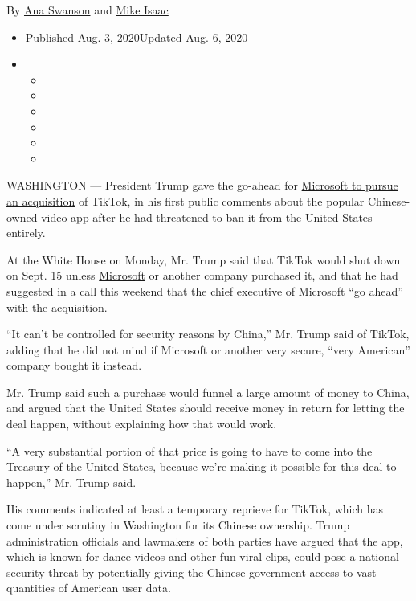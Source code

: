 By \href{https://www.nytimes.com/by/ana-swanson}{Ana Swanson} and
\href{https://www.nytimes.com/by/mike-isaac}{Mike Isaac}

\begin{itemize}
\item
  Published Aug. 3, 2020Updated Aug. 6, 2020
\item
  \begin{itemize}
  \item
  \item
  \item
  \item
  \item
  \item
  \end{itemize}
\end{itemize}

WASHINGTON --- President Trump gave the go-ahead for
\href{https://www.nytimes.com/2020/08/02/business/economy/trump-tiktok-china-national-security.html}{Microsoft
to pursue an acquisition} of TikTok, in his first public comments about
the popular Chinese-owned video app after he had threatened to ban it
from the United States entirely.

At the White House on Monday, Mr. Trump said that TikTok would shut down
on Sept. 15 unless
\href{https://www.nytimes.com/2020/08/03/us/navy-seal-museum-kaepernick.html}{Microsoft}
or another company purchased it, and that he had suggested in a call
this weekend that the chief executive of Microsoft ``go ahead'' with the
acquisition.

``It can't be controlled for security reasons by China,'' Mr. Trump said
of TikTok, adding that he did not mind if Microsoft or another very
secure, ``very American'' company bought it instead.

Mr. Trump said such a purchase would funnel a large amount of money to
China, and argued that the United States should receive money in return
for letting the deal happen, without explaining how that would work.

``A very substantial portion of that price is going to have to come into
the Treasury of the United States, because we're making it possible for
this deal to happen,'' Mr. Trump said.

His comments indicated at least a temporary reprieve for TikTok, which
has come under scrutiny in Washington for its Chinese ownership. Trump
administration officials and lawmakers of both parties have argued that
the app, which is known for dance videos and other fun viral clips,
could pose a national security threat by potentially giving the Chinese
government access to vast quantities of American user data.


